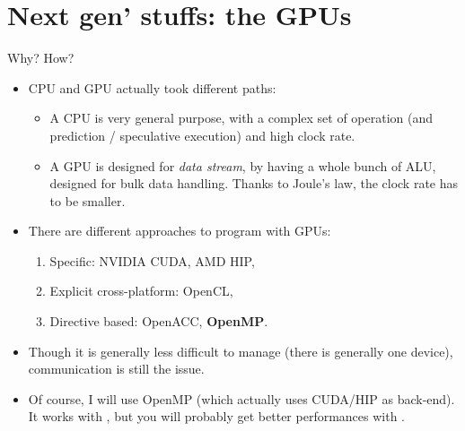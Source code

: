 \section{Next gen' stuffs: the GPUs}

\begin{frame}{Why? How?}
	\begin{itemize}
		\item CPU and GPU actually took different paths:\begin{itemize}
			\item A CPU is very general purpose, with a complex set of operation (and prediction / speculative execution) and high clock rate.
			\item A GPU is designed for \textit{data stream}, by having a whole bunch of ALU, designed for bulk data handling. Thanks to Joule's law, the clock rate has to be smaller.
		\end{itemize}
		\item There are different approaches to program with GPUs:\begin{enumerate}
			\item Specific: NVIDIA CUDA, AMD HIP,
			\item Explicit cross-platform: OpenCL,
			\item Directive based: OpenACC, \textbf{OpenMP}.
		\end{enumerate}
	\item Though it is generally less difficult to manage (there is generally one device), communication is still the issue.
	\item Of course, I will use OpenMP (which actually uses CUDA/HIP as back-end). It works with , but you will probably get better performances with .
	\end{itemize}
\end{frame}

